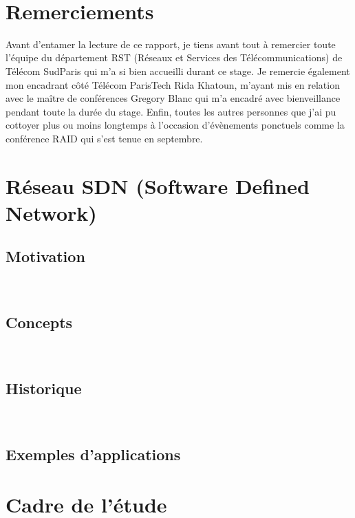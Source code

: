 \documentclass[a4paper,10pt]{article}
\begin{document}


\newpage
~
\section*{\Huge{Remerciements\\}}
\Large Avant d'entamer la lecture de ce rapport, je tiens avant tout à remercier toute l'équipe du département RST (Réseaux et Services des Télécommunications) de Télécom SudParis qui m'a si bien accueilli durant ce stage. Je remercie également mon encadrant côté Télécom ParisTech Rida Khatoun, m'ayant mis en relation avec le maître de conférences Gregory Blanc qui m'a encadré avec bienveillance pendant toute la durée du stage. Enfin, toutes les autres personnes que j'ai pu cottoyer plus ou moins longtemps à l'occasion d'évènements ponctuels comme la conférence RAID qui s'est tenue en septembre.


\newpage
\tableofcontents


\newpage
{}
\section{Réseau SDN (Software Defined Network)}
	\subsection{Motivation}
		
		~\\
	\subsection{Concepts}
		
		~\\
	\subsection{Historique}
		
		~\\
	\subsection{Exemples d'applications}
		
\newpage
{}
\section{Cadre de l'étude}
\end{document}
